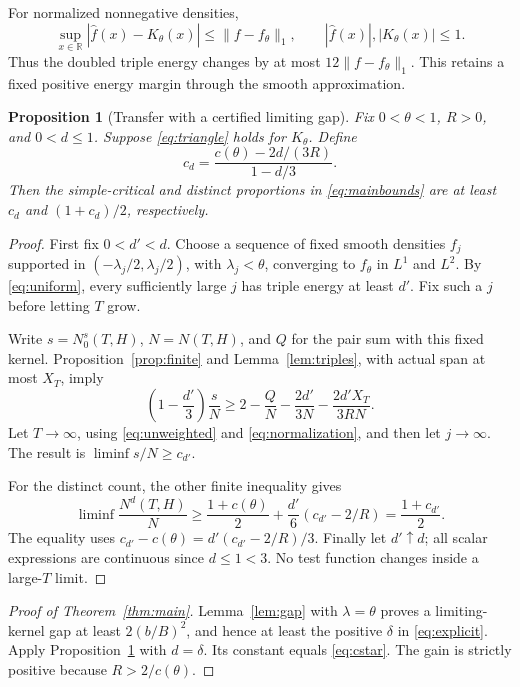 ﻿\documentclass[11pt]{article}
\newtheorem{proposition}[theorem]{Proposition}
\theoremstyle{remark}
\newcommand{\R}{\mathbb R}
\begin{document}
For normalized nonnegative densities,
\begin{equation}\label{eq:uniform}
 \sup_{x\in\R}|\widehat f(x)-K_\theta(x)|\le\|f-f_\theta\|_1,
 \qquad |\widehat f(x)|,|K_\theta(x)|\le1.
\end{equation}
Thus the doubled triple energy changes by at most
$12\|f-f_\theta\|_1$. This retains a fixed positive energy margin
through the smooth approximation.

\begin{proposition}[Transfer with a certified limiting gap]\label{prop:transfer}
Fix $0<\theta<1$, $R>0$, and $0<d\le1$. Suppose \eqref{eq:triangle}
holds for $K_\theta$. Define
\[
 c_d=\frac{c(\theta)-2d/(3R)}{1-d/3}.
\]
Then the simple-critical and distinct proportions in \eqref{eq:mainbounds}
are at least $c_d$ and $(1+c_d)/2$, respectively.
\end{proposition}
\begin{proof}
First fix $0<d'<d$. Choose a sequence of fixed smooth densities $f_j$
supported in $(-\lambda_j/2,\lambda_j/2)$, with
$\lambda_j<\theta$, converging to $f_\theta$ in $L^1$ and $L^2$.
By \eqref{eq:uniform}, every sufficiently large $j$ has triple energy
at least $d'$. Fix such a $j$ before letting $T$ grow.

Write $s=N_0^s(T,H)$, $N=N(T,H)$, and $Q$ for the pair sum with this
fixed kernel. Proposition~\ref{prop:finite} and Lemma~\ref{lem:triples},
with actual span at most $X_T$, imply
\[
 \left(1-\frac{d'}3\right)\frac sN
 \ge2-\frac QN-\frac{2d'}{3N}-\frac{2d'X_T}{3RN}.
\]
Let $T\to\infty$, using \eqref{eq:unweighted} and
\eqref{eq:normalization}, and then let $j\to\infty$. The result is
$\liminf s/N\ge c_{d'}$.

For the distinct count, the other finite inequality gives
\[
 \liminf\frac{N^d(T,H)}N
 \ge\frac{1+c(\theta)}2+\frac{d'}6(c_{d'}-2/R)
 =\frac{1+c_{d'}}2.
\]
The equality uses $c_{d'}-c(\theta)=d'(c_{d'}-2/R)/3$.
Finally let $d'\uparrow d$; all scalar expressions are continuous since
$d\le1<3$. No test function changes inside a large-$T$ limit.
\end{proof}

\begin{proof}[Proof of Theorem~\ref{thm:main}]
Lemma~\ref{lem:gap} with $\lambda=\theta$ proves a limiting-kernel gap
at least $2(b/B)^2$, and hence at least the positive $\delta$ in
\eqref{eq:explicit}. Apply Proposition~\ref{prop:transfer} with
$d=\delta$. Its constant equals \eqref{eq:cstar}. The gain is strictly
positive because $R>2/c(\theta)$.
\end{proof}
\end{document}
